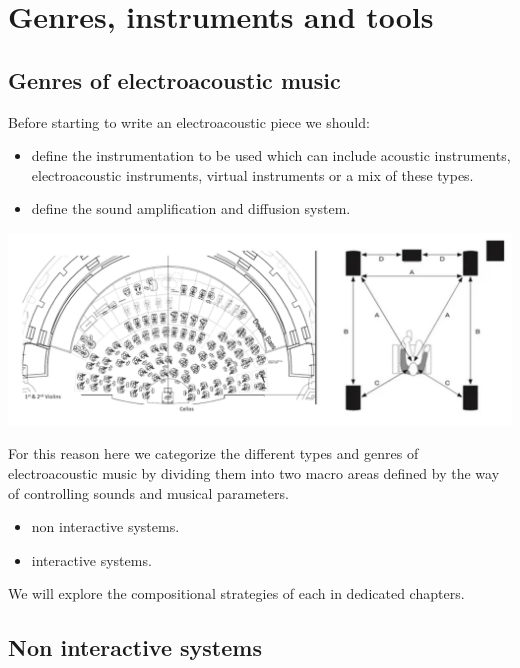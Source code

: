 \chapter{Genres, instruments and tools}

\section{Genres of electroacoustic music }\label{genres-of-electroacoustic-music}

Before starting to write an electroacoustic piece we should:

\begin{itemize}
\tightlist
\item define the instrumentation to be used which can include acoustic instruments, electroacoustic instruments, virtual instruments or a mix of these types.
\item define the sound amplification and diffusion system.
\end{itemize}

\begin{center}
\includegraphics[scale=0.9]{../img/dispo.png}
\end{center}

For this reason here we categorize the different types and genres of electroacoustic music by dividing them into two macro areas defined by the way of controlling sounds and musical parameters.

\begin{itemize}
\tightlist
\item non interactive systems.
\item interactive systems.
\end{itemize}

We will explore the compositional strategies of each in dedicated chapters.

\section{Non interactive systems}\label{non-interactive-systems}

